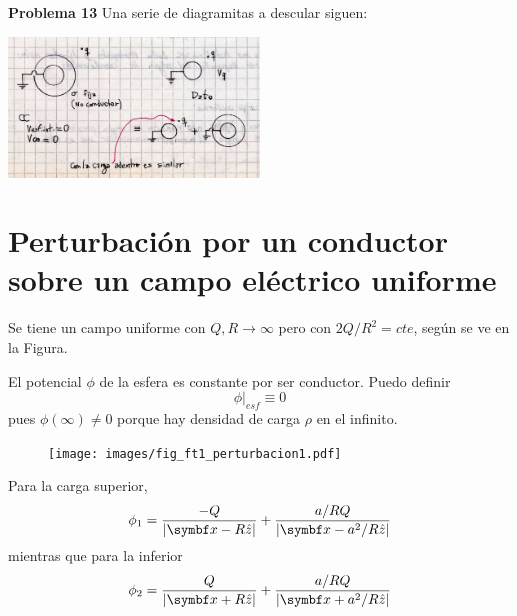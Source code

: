 \documentclass[10pt,oneside]{CBFT_book}
\begin{document}
\begin{ejemplo}{\bf Problema 13}
Una serie de diagramitas a descular siguen:

\includegraphics[width=0.5\textwidth]{images/fig_ft1_problema_13b.jpg}
 
\end{ejemplo}



\section{Perturbación por un conductor sobre un campo eléctrico uniforme}

Se tiene un campo uniforme con $Q,R \to \infty$ pero con $2Q/R^2 = cte$, según se ve en la Figura.


El potencial $\phi$ de la esfera es constante por ser conductor.
Puedo definir 
\[
	\phi|_{esf} \equiv 0
\]
pues $\phi(\infty)\neq 0 $ porque hay densidad de carga $\rho$ en el infinito.

\begin{figure}[htb]
	\begin{center}
	\texttt{[image: images/fig\_ft1\_perturbacion1.pdf]}	 
	\end{center}
	\caption{}
\end{figure}
Para la carga superior,
\[
	\phi_1 = \frac{-Q}{|\vb{x} - R\hat{z}|} + \frac{a/R Q}{|\vb{x} - a^2/R\hat{z}|}
\]
mientras que para la inferior
\[
	\phi_2 = \frac{Q}{|\vb{x} + R\hat{z}|} + \frac{ a/R Q}{|\vb{x} + a^2/R\hat{z}|}
\]
\end{document}
